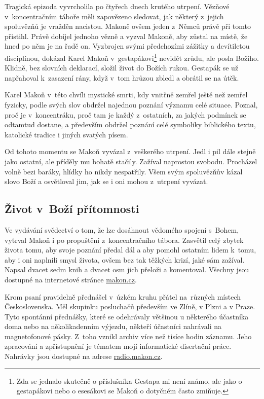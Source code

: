 Tragická epizoda vyvrcholila po čtyřech dnech krutého utrpení. Vězňové
v~koncentračním táboře měli zapovězeno sledovat, jak některý z~jejich spoluvězňů
je vražděn nacistou. Makoně ovšem jeden z~Němců právě při tomto přistihl. Právě
dobíjel jednoho vězně a vyzval Makoně, aby zůstal na místě, že hned po něm je na
řadě on. Vyzbrojen svými předchozími zážitky a devítiletou disciplínou, dokázal
Karel Makoň v~gestapákovi\footnote{Zda se jednalo skutečně o příslušníka Gestapa
mi není známo, ale jako o gestapákovi nebo o esesákovi se Makoň o dotyčném často
zmiňuje.} nevidět zrůdu, ale posla Božího. Klidně, bez slovních deklarací,
složil život do Božích rukou. Gestapák se už napřahoval k~zasazení rány, když
v~tom hrůzou zbledl a obrátil se na útěk.

Karel Makoň v~této chvíli mystické smrti, kdy vnitřně zemřel ještě než zemřel
fyzicky, podle svých slov obdržel najednou poznání významu celé situace. Poznal,
proč je v~koncentráku, proč tam je každý z~ostatních, za jakých podmínek se
odtamtud dostane, a především obdržel poznání celé symboliky biblického textu,
katolické tradice i jiných svatých písem.

Od tohoto momentu se Makoň vyvázal z~veškerého utrpení. Jedl i pil dále stejně
jako ostatní, ale příděly mu bohatě stačily. Zažíval naprostou svobodu.
Procházel volně bezi baráky, hlídky ho nikdy nespatřily. Všem svým spoluvězňův
kázal slovo Boží a osvětloval jim, jak se i oni mohou z~utrpení vyvázat.

\subsection{Život v~Boží přítomnosti}

Ve vydávání svědectví o tom, že lze dosáhnout vědomého spojení s~Bohem, vytrval
Makoň i po propuštění z~koncentračního tábora. Zasvětil celý zbytek života tomu,
aby svoje poznání předal dál a aby pomohl ostatním lidem k~tomu, aby i oni
naplnili smysl života, ovšem bez tak těžkých krizí, jaké sám zažíval. Napsal
dvacet sedm knih a dvacet osm jich přeloži a komentoval. Všechny jsou dostupné
na internetové stránce \url{makon.cz}.

Krom psaní pravidelně přednášel v~úzkém kruhu přátel na~různých místech
Československa. Měl skupinku posluchačů především ve Zlíně, v Plzni a v Praze.
Tyto spontánní přednášky, které se odehrávaly většinou u některého účastníka
doma nebo na několikadenním výjezdu, někteří účastníci nahrávali na
magnetofonové pásky. Z~toho vznikl archiv více než tisíce hodin záznamu. Jeho
zpracování a zpřístupnění je tématem mojí informatické disertační
práce\cite{kruuza2021iterativni}. Nahrávky jsou dostupné na adrese
\url{radio.makon.cz}.

